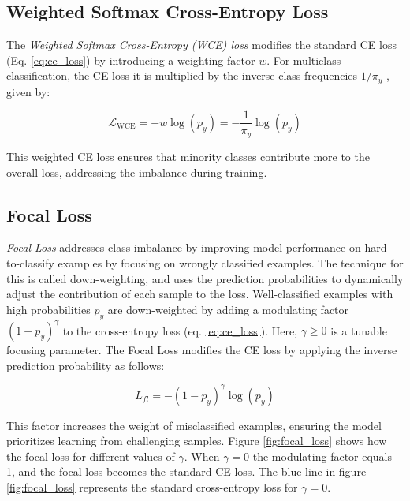 \subsection{Weighted Softmax Cross-Entropy Loss}
\label{sec:wce_loss}
The \emph{Weighted Softmax Cross-Entropy (WCE) loss} modifies the standard CE loss (Eq. \eqref{eq:ce_loss}) by introducing a weighting factor $w$. For multiclass classification, the CE loss it is multiplied by the inverse class frequencies $1/\pi_y$ \cite{zhang2023deep,lin2018focallossdenseobject}, given by:

\begin{equation}
    \label{eq:wce_loss}
    \mathcal{L}_{\text{WCE}} = -w \log(p_y) = - \frac{1}{\pi_y} \log(p_y)
\end{equation}

\noindent This weighted CE loss ensures that minority classes contribute more to the overall loss, addressing the imbalance during training.


\subsection{Focal Loss}
\label{sec:fl}
\emph{Focal Loss} \cite{lin2018focallossdenseobject} addresses class imbalance by improving model performance on hard-to-classify examples by focusing on wrongly classified examples. The technique for this is called down-weighting, and uses the prediction probabilities to dynamically adjust the contribution of each sample to the loss. Well-classified examples with high probabilities $p_y$ are down-weighted by adding a modulating factor $(1 - p_y)^\gamma$ to the cross-entropy loss (eq. \eqref{eq:ce_loss}). Here, $\gamma \geq 0$ is a tunable focusing parameter. The Focal Loss modifies the CE loss by applying the inverse prediction probability as follows:

\begin{equation}
    \label{eq:focal_loss}
    L_{fl} = -(1 - p_y)^\gamma \log(p_y)
\end{equation}

\noindent This factor increases the weight of misclassified examples, ensuring the model prioritizes learning from challenging samples. Figure \ref{fig:focal_loss} shows how the focal loss for different values of $\gamma$. When $\gamma = 0$ the modulating factor equals 1, and the focal loss becomes the standard CE loss. The blue line in figure \ref{fig:focal_loss} represents the standard cross-entropy loss for $\gamma = 0$.

